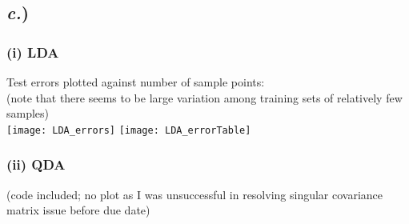 \documentclass{report}
\begin{document}
\subsection*{\textit{c.})}
\begin{multicols}{2}
\subsubsection*{(i) LDA}

Test errors plotted against number of sample points: \\
\small(note that there seems to be large variation among training sets of relatively few samples)\\
\texttt{[image: LDA\_errors]}
\texttt{[image: LDA\_errorTable]}

\columnbreak
\subsubsection*{(ii) QDA}


(code included; no plot as I was unsuccessful in resolving singular covariance matrix issue before due date)\\



\end{multicols}
\end{document}
